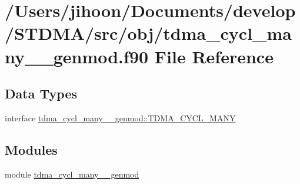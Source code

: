 \hypertarget{tdma__cycl__many____genmod_8f90}{}\section{/\+Users/jihoon/\+Documents/develop/\+S\+T\+D\+M\+A/src/obj/tdma\+\_\+cycl\+\_\+many\+\_\+\+\_\+genmod.f90 File Reference}
\label{tdma__cycl__many____genmod_8f90}
\subsection*{Data Types}
\begin{DoxyCompactItemize}
\item 
interface \mbox{\hyperlink{interfacetdma__cycl__many____genmod_1_1_t_d_m_a___c_y_c_l___m_a_n_y}{tdma\+\_\+cycl\+\_\+many\+\_\+\+\_\+genmod\+::\+T\+D\+M\+A\+\_\+\+C\+Y\+C\+L\+\_\+\+M\+A\+NY}}
\end{DoxyCompactItemize}
\subsection*{Modules}
\begin{DoxyCompactItemize}
\item 
module \mbox{\hyperlink{namespacetdma__cycl__many____genmod}{tdma\+\_\+cycl\+\_\+many\+\_\+\+\_\+genmod}}
\end{DoxyCompactItemize}

